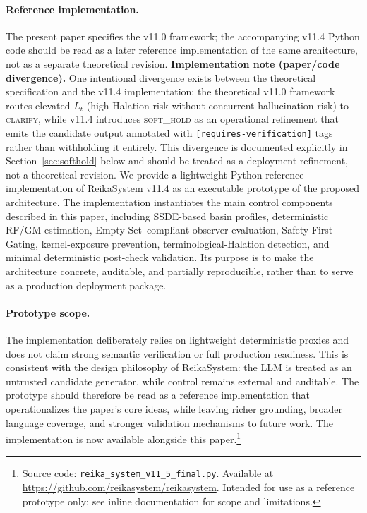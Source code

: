 \documentclass[11pt,a4paper]{article}
\begin{document}
\paragraph{Reference implementation.}
The present paper specifies the v11.0 framework; the accompanying v11.4 Python
code should be read as a later reference implementation of the same architecture,
not as a separate theoretical revision.
\textbf{Implementation note (paper/code divergence).}
One intentional divergence exists between the theoretical specification and the
v11.4 implementation: the theoretical v11.0 framework routes elevated $L_t$
(high Halation risk without concurrent hallucination risk) to \textsc{clarify},
while v11.4 introduces \textsc{soft\_hold} as an operational refinement that
emits the candidate output annotated with \texttt{[requires-verification]} tags
rather than withholding it entirely.
This divergence is documented explicitly in Section~\ref{sec:softhold} below and
should be treated as a deployment refinement, not a theoretical revision.
We provide a lightweight Python reference implementation of ReikaSystem v11.4
as an executable prototype of the proposed architecture.
The implementation instantiates the main control components described in this
paper, including SSDE-based basin profiles, deterministic RF/GM estimation,
Empty Set--compliant observer evaluation, Safety-First Gating,
kernel-exposure prevention, terminological-Halation detection,
and minimal deterministic post-check validation.
Its purpose is to make the architecture concrete, auditable, and partially
reproducible, rather than to serve as a production deployment package.

\paragraph{Prototype scope.}
The implementation deliberately relies on lightweight deterministic proxies
and does not claim strong semantic verification or full production readiness.
This is consistent with the design philosophy of ReikaSystem: the LLM is
treated as an untrusted candidate generator, while control remains external
and auditable.
The prototype should therefore be read as a reference implementation that
operationalizes the paper's core ideas, while leaving richer grounding,
broader language coverage, and stronger validation mechanisms to future work.
The implementation is now available alongside this paper.\footnote{
  Source code: \texttt{reika\_system\_v11\_5\_final.py}.
  Available at \url{https://github.com/reikasystem/reikasystem}.
  Intended for use as a reference prototype only;
  see inline documentation for scope and limitations.
}
\end{document}
